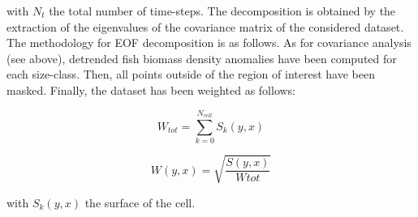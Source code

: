 with $N_t$ the total number of time-steps. The decomposition is obtained by the extraction of the eigenvalues of the covariance matrix of the considered dataset. \\

The methodology for EOF decomposition is as follows. As for covariance analysis (see above), detrended fish biomass density anomalies have been computed for each size-class. Then, all points outside of the region of interest have been masked. Finally, the dataset has been weighted as follows:

\begin{displaymath}
W_{tot}=\sum_{k=0}^{N_{cell}}S_k(y, x) 
\end{displaymath}

\begin{displaymath}
W(y, x) = \sqrt{\frac{S(y, x)}{Wtot}} 
\end{displaymath}

with $S_k(y, x)$ the surface of the cell.










